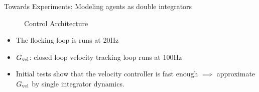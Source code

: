 \begin{frame}{Towards Experiments: Modeling agents as double integrators}
\begin{figure}[h!]
	
	\caption{Control Architecture}
	\label{fig:control_arch}	
\end{figure}
\begin{itemize}
	\item The flocking loop is runs at 20Hz 
	\item $G_{\textnormal{vel}}$: closed loop velocity tracking loop runs at 100Hz
	\item Initial tests show that the velocity controller is fast enough $\implies$ approximate $G_{\textnormal{vel}}$ by single integrator dynamics.
\end{itemize}
\end{frame}
%

